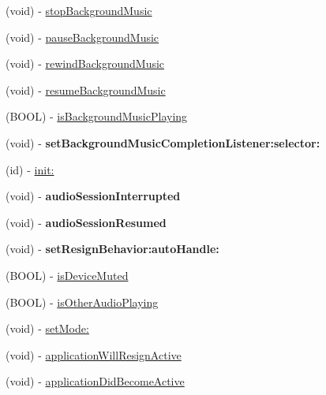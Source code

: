 \begin{DoxyCompactItemize}
\item 
(void) -\/ \hyperlink{interfaceCDAudioManager_a2403abdc32f144a0d57d915db42d35a6}{stop\+Background\+Music}
\item 
(void) -\/ \hyperlink{interfaceCDAudioManager_acbd505494ec2f01e484dfca635b208b8}{pause\+Background\+Music}
\item 
(void) -\/ \hyperlink{interfaceCDAudioManager_a98e99a2b9eabcf89ad7419f6f809c65a}{rewind\+Background\+Music}
\item 
(void) -\/ \hyperlink{interfaceCDAudioManager_a9bcc620677df7b828dd69c951b445062}{resume\+Background\+Music}
\item 
(B\+O\+OL) -\/ \hyperlink{interfaceCDAudioManager_a3b519950dee5dd8e79c8bbbf3c0f7e26}{is\+Background\+Music\+Playing}
\item 
\mbox{\label{interfaceCDAudioManager_ae333be8046b55eabda5cd6ffbf1ecf9b}} 
(void) -\/ {\bfseries set\+Background\+Music\+Completion\+Listener\+:selector\+:}
\item 
(id) -\/ \hyperlink{interfaceCDAudioManager_ae2d8ef3daed8297ee37cd14b67687407}{init\+:}
\item 
\mbox{\label{interfaceCDAudioManager_aeeaf362faad4417ac15d22e0862c1641}} 
(void) -\/ {\bfseries audio\+Session\+Interrupted}
\item 
\mbox{\label{interfaceCDAudioManager_a844dd2990cbadb04e35364abed23f690}} 
(void) -\/ {\bfseries audio\+Session\+Resumed}
\item 
\mbox{\label{interfaceCDAudioManager_a861e77b8bef383849bc2335eaec5bff8}} 
(void) -\/ {\bfseries set\+Resign\+Behavior\+:auto\+Handle\+:}
\item 
(B\+O\+OL) -\/ \hyperlink{interfaceCDAudioManager_a5a4df8bc83cbc6e6723196d3d4ec4974}{is\+Device\+Muted}
\item 
(B\+O\+OL) -\/ \hyperlink{interfaceCDAudioManager_ab664b34e99f6f3e2158f2df910cf3a95}{is\+Other\+Audio\+Playing}
\item 
(void) -\/ \hyperlink{interfaceCDAudioManager_a72fd182d62cc75dfa3701da4a5d97346}{set\+Mode\+:}
\item 
(void) -\/ \hyperlink{interfaceCDAudioManager_a5265cc9a823688a547aa60e8995ba423}{application\+Will\+Resign\+Active}
\item 
(void) -\/ \hyperlink{interfaceCDAudioManager_aa572c7a296c0b2de3564f8da368835ef}{application\+Did\+Become\+Active}

\end{DoxyCompactItemize}
